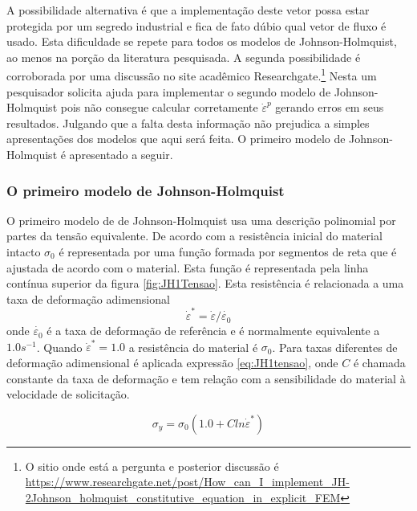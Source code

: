  A possibilidade alternativa 
 é que a implementação deste vetor possa estar protegida por um segredo industrial e fica de fato dúbio qual vetor de fluxo é usado. Esta dificuldade se repete para todos os modelos de Johnson-Holmquist, ao menos na porção da literatura pesquisada. A segunda possibilidade é corroborada por uma discussão no site acadêmico Researchgate.\footnote{ O sitio onde está a pergunta e posterior discussão é  \url{https://www.researchgate.net/post/How_can_I_implement_JH-2Johnson_holmquist_constitutive_equation_in_explicit_FEM} } Nesta um pesquisador solicita ajuda para implementar o segundo modelo de Johnson-Holmquist pois não consegue calcular corretamente $ \dot{\varepsilon}^p $ gerando erros em seus resultados. Julgando que a falta desta informação não prejudica a simples apresentações dos modelos que aqui será feita. O primeiro modelo de Johnson-Holmquist é apresentado a seguir. \\
 
 \subsubsection{O primeiro modelo de Johnson-Holmquist}
 
O primeiro modelo de de Johnson-Holmquist usa uma descrição polinomial por partes da tensão equivalente. De acordo com \cite{holmquist_johnson_2002} a resistência inicial do material intacto $ \sigma_0 $ é representada por uma função formada por segmentos de reta que é ajustada de acordo com o material. Esta função é representada pela linha contínua superior da figura \ref{fig:JH1Tensao}. Esta resistência é relacionada a uma taxa de deformação adimensional
\begin{equation}
    \dot{\varepsilon}^* = \dot{\varepsilon}/\dot{\varepsilon_0}
\end{equation}
onde $ \dot{\varepsilon_0} $ 
é a taxa de deformação de referência e é normalmente equivalente a $1.0 s^{-1} $. Quando $ \dot{\varepsilon}^* = 1.0 $ a resistência do material é $ \sigma_0 $. Para taxas diferentes de deformação adimensional é aplicada expressão \ref{eq:JH1tensao}, onde $ C $ é chamada constante da taxa de deformação e tem relação com a sensibilidade do material à velocidade de solicitação. 

\begin{equation} \label{eq:JH1tensao}
    \sigma_y = \sigma_0(1.0 + C ln\dot{\varepsilon}^*)  
\end{equation}

